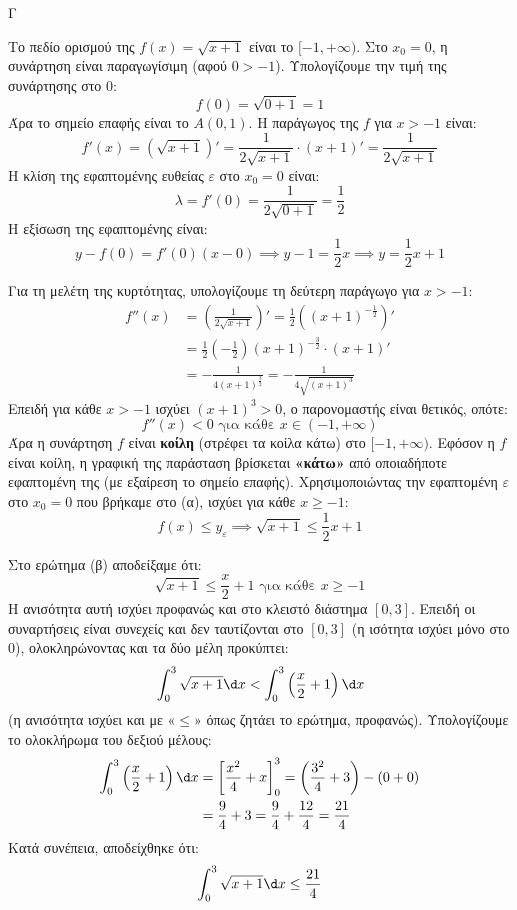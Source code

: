 \begin{thema}{Γ}
\begin{erwthma}
\item Το πεδίο ορισμού της $f(x) = \sqrt{x+1}$ είναι το $[-1, +\infty)$. Στο $x_0 = 0$, η συνάρτηση είναι παραγωγίσιμη (αφού $0 > -1$). 
Υπολογίζουμε την τιμή της συνάρτησης στο $0$:
\[ f(0) = \sqrt{0+1} = 1 \]
Άρα το σημείο επαφής είναι το $A(0, 1)$.
Η παράγωγος της $f$ για $x > -1$ είναι:
\[ f'(x) = (\sqrt{x+1})' = \frac{1}{2\sqrt{x+1}} \cdot (x+1)' = \frac{1}{2\sqrt{x+1}} \]
Η κλίση της εφαπτομένης ευθείας $\varepsilon$ στο $x_0 = 0$ είναι:
\[ \lambda = f'(0) = \frac{1}{2\sqrt{0+1}} = \frac{1}{2} \]
Η εξίσωση της εφαπτομένης είναι:
\[ y - f(0) = f'(0)(x - 0) \implies y - 1 = \frac{1}{2}x \implies y = \frac{1}{2}x + 1 \]

\item Για τη μελέτη της κυρτότητας, υπολογίζουμε τη δεύτερη παράγωγο για $x > -1$:
\begin{align*}
f''(x) &= \left( \frac{1}{2\sqrt{x+1}} \right)' = \frac{1}{2} \left( (x+1)^{-\frac{1}{2}} \right)' \\
&= \frac{1}{2} \left( -\frac{1}{2} \right) (x+1)^{-\frac{3}{2}} \cdot (x+1)' \\
&= -\frac{1}{4(x+1)^{\frac{3}{2}}} = -\frac{1}{4\sqrt{(x+1)^3}}
\end{align*}
Επειδή για κάθε $x > -1$ ισχύει $(x+1)^3 > 0$, ο παρονομαστής είναι θετικός, οπότε:
\[ f''(x) < 0 \text{ για κάθε } x \in (-1, +\infty) \]
Άρα η συνάρτηση $f$ είναι \textbf{κοίλη} (στρέφει τα κοίλα κάτω) στο $[-1, +\infty)$.
Εφόσον η $f$ είναι κοίλη, η γραφική της παράσταση βρίσκεται \textbf{«κάτω»} από οποιαδήποτε εφαπτομένη της (με εξαίρεση το σημείο επαφής).
Χρησιμοποιώντας την εφαπτομένη $\varepsilon$ στο $x_0 = 0$ που βρήκαμε στο (α), ισχύει για κάθε $x \ge -1$:
\[ f(x) \le y_{\varepsilon} \implies \sqrt{x+1} \le \frac{1}{2}x + 1 \]

\item Στο ερώτημα (β) αποδείξαμε ότι:
\[ \sqrt{x+1} \le \frac{x}{2} + 1 \text{ για κάθε } x \ge -1 \]
Η ανισότητα αυτή ισχύει προφανώς και στο κλειστό διάστημα $[0, 3]$. 
Επειδή οι συναρτήσεις είναι συνεχείς και δεν ταυτίζονται στο $[0,3]$ (η ισότητα ισχύει μόνο στο $0$), ολοκληρώνοντας και τα δύο μέλη προκύπτει:
\[ \int_{0}^{3} \sqrt{x+1} \d x < \int_{0}^{3} \left( \frac{x}{2} + 1 \right) \d x \]
(η ανισότητα ισχύει και με «$\le$» όπως ζητάει το ερώτημα, προφανώς).
Υπολογίζουμε το ολοκλήρωμα του δεξιού μέλους:
\begin{align*}
\int_{0}^{3} \left( \frac{x}{2} + 1 \right) \d x &= \left[ \frac{x^2}{4} + x \right]_{0}^{3} = \left( \frac{3^2}{4} + 3 \right) - (0 + 0) \\&= \frac{9}{4} + 3 = \frac{9}{4} + \frac{12}{4} = \frac{21}{4}
\end{align*}
Κατά συνέπεια, αποδείχθηκε ότι:
\[ \int_{0}^{3} \sqrt{x+1} \d x \le \frac{21}{4} \]


\end{erwthma}
\end{thema}
